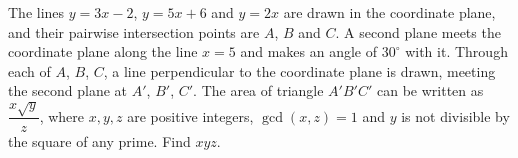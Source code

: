 The lines $y=3x-2$, $y=5x+6$ and $y=2x$ are drawn in the coordinate plane, and their pairwise intersection points are $A$, $B$ and $C$. A second plane meets the coordinate plane along the line $x=5$ and makes an angle of $30^\circ$ with it. Through each of $A$, $B$, $C$, a line perpendicular to the coordinate plane is drawn, meeting the second plane at $A'$, $B'$, $C'$. The area of triangle $A'B'C'$ can be written as $\dfrac{x\sqrt y}{z}$, where $x,y,z$ are positive integers, $\gcd(x,z)=1$ and $y$ is not divisible by the square of any prime. Find $xyz$.
